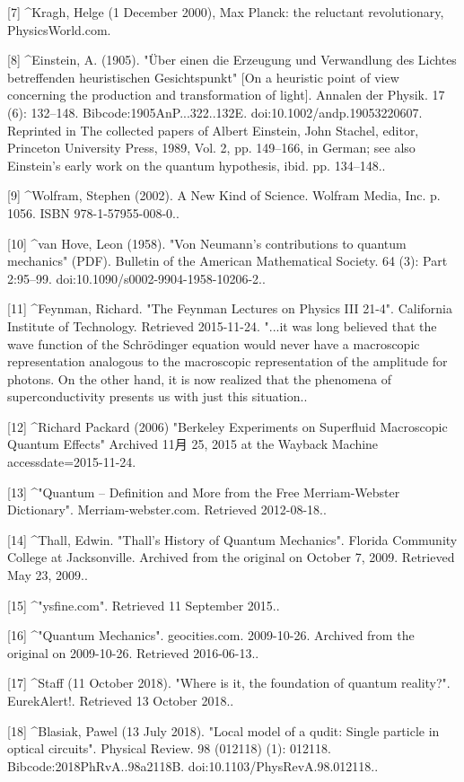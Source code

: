 [7]
^Kragh, Helge (1 December 2000), Max Planck: the reluctant revolutionary, PhysicsWorld.com.

[8]
^Einstein, A. (1905). "Über einen die Erzeugung und Verwandlung des Lichtes betreffenden heuristischen Gesichtspunkt" [On a heuristic point of view concerning the production and transformation of light]. Annalen der Physik. 17 (6): 132–148. Bibcode:1905AnP...322..132E. doi:10.1002/andp.19053220607. Reprinted in The collected papers of Albert Einstein, John Stachel, editor, Princeton University Press, 1989, Vol. 2, pp. 149–166, in German; see also Einstein's early work on the quantum hypothesis, ibid. pp. 134–148..

[9]
^Wolfram, Stephen (2002). A New Kind of Science. Wolfram Media, Inc. p. 1056. ISBN 978-1-57955-008-0..

[10]
^van Hove, Leon (1958). "Von Neumann's contributions to quantum mechanics" (PDF). Bulletin of the American Mathematical Society. 64 (3): Part 2:95–99. doi:10.1090/s0002-9904-1958-10206-2..

[11]
^Feynman, Richard. "The Feynman Lectures on Physics III 21-4". California Institute of Technology. Retrieved 2015-11-24. "...it was long believed that the wave function of the Schrödinger equation would never have a macroscopic representation analogous to the macroscopic representation of the amplitude for photons. On the other hand, it is now realized that the phenomena of superconductivity presents us with just this situation..

[12]
^Richard Packard (2006) "Berkeley Experiments on Superfluid Macroscopic Quantum Effects" Archived 11月 25, 2015 at the Wayback Machine accessdate=2015-11-24.

[13]
^"Quantum – Definition and More from the Free Merriam-Webster Dictionary". Merriam-webster.com. Retrieved 2012-08-18..

[14]
^Thall, Edwin. "Thall's History of Quantum Mechanics". Florida Community College at Jacksonville. Archived from the original on October 7, 2009. Retrieved May 23, 2009..

[15]
^"ysfine.com". Retrieved 11 September 2015..

[16]
^"Quantum Mechanics". geocities.com. 2009-10-26. Archived from the original on 2009-10-26. Retrieved 2016-06-13..

[17]
^Staff (11 October 2018). "Where is it, the foundation of quantum reality?". EurekAlert!. Retrieved 13 October 2018..

[18]
^Blasiak, Pawel (13 July 2018). "Local model of a qudit: Single particle in optical circuits". Physical Review. 98 (012118) (1): 012118. Bibcode:2018PhRvA..98a2118B. doi:10.1103/PhysRevA.98.012118..

